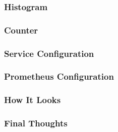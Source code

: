 \begin{frame}
\frametitle{Histogram}
\end{frame}

\begin{frame}
\frametitle{Counter}
\end{frame}

\begin{frame}
\frametitle{Service Configuration}
\end{frame}

\begin{frame}
\frametitle{Prometheus Configuration}
\end{frame}

\begin{frame}
\frametitle{How It Looks}
\end{frame}

\begin{frame}
\frametitle{Final Thoughts}
\end{frame}


